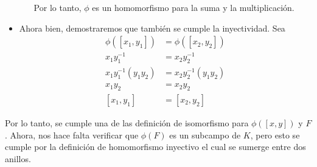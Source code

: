 \begin{problema}[Problema 4]
\begin{dem}
\begin{itemize}
\begin{itemize}
\begin{enumerate}
                        \end{enumerate}
                        Por lo tanto, $\phi$ es un homomorfismo para la suma y la multiplicación.
                    \end{itemize}
                    \item Ahora bien, demostraremos que también se cumple la inyectividad. Sea
                    \begin{align*}
                        \phi([x_1,y_1]) &= \phi([x_2,y_2])\\
                        x_1y_1^{-1} &= x_2y_2^{-1}\\
                        x_1y_1^{-1}(y_1y_2) &= x_2y_2^{-1}(y_1y_2)\\
                        x_1y_2 &= x_2y_2\\
                        [x_1,y_1] &= [x_2,y_2]
                    \end{align*}
        \end{itemize}
        Por lo tanto, se cumple una de las definición de isomorfismo para $\phi([x,y])$ y $F$. Ahora, nos hace falta verificar que $\phi(F)$ es un subcampo de $K$, pero esto se cumple por la definición de  homomorfismo inyectivo el cual se sumerge entre dos anillos. 
    \end{dem}
\end{problema}

%
%

